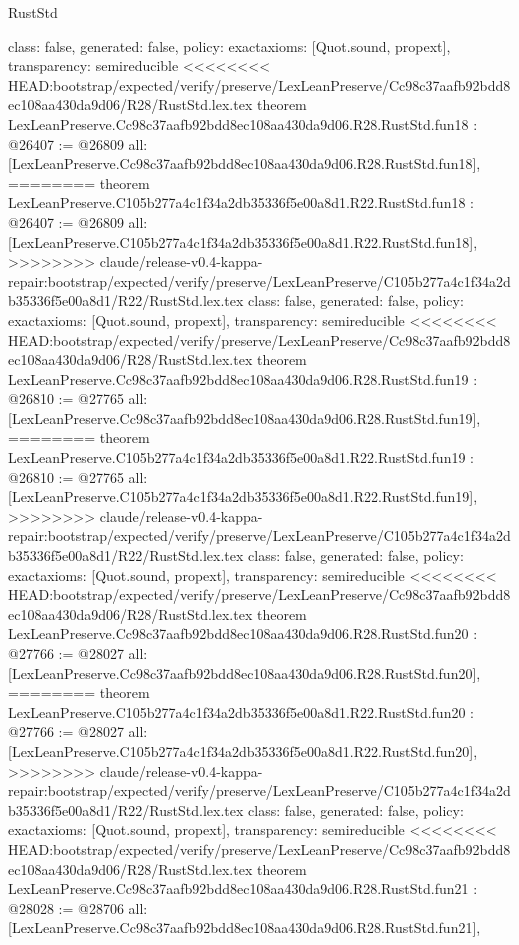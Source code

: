 \begin{lexlean}{RustStd}
\begin{coremodule}
{\begin{coremodule}
{{{{{{{{{{{{{{{{{{{{{  class: false,
  generated: false,
  policy: exact{axioms: [Quot.sound, propext]},
  transparency: semireducible
}
<<<<<<<< HEAD:bootstrap/expected/verify/preserve/LexLeanPreserve/Cc98c37aafb92bdd8ec108aa430da9d06/R28/RustStd.lex.tex
theorem LexLeanPreserve.Cc98c37aafb92bdd8ec108aa430da9d06.R28.RustStd.fun18 : @26407 := @26809 {
  all: [LexLeanPreserve.Cc98c37aafb92bdd8ec108aa430da9d06.R28.RustStd.fun18],
========
theorem LexLeanPreserve.C105b277a4c1f34a2db35336f5e00a8d1.R22.RustStd.fun18 : @26407 := @26809 {
  all: [LexLeanPreserve.C105b277a4c1f34a2db35336f5e00a8d1.R22.RustStd.fun18],
>>>>>>>> claude/release-v0.4-kappa-repair:bootstrap/expected/verify/preserve/LexLeanPreserve/C105b277a4c1f34a2db35336f5e00a8d1/R22/RustStd.lex.tex
  class: false,
  generated: false,
  policy: exact{axioms: [Quot.sound, propext]},
  transparency: semireducible
}
<<<<<<<< HEAD:bootstrap/expected/verify/preserve/LexLeanPreserve/Cc98c37aafb92bdd8ec108aa430da9d06/R28/RustStd.lex.tex
theorem LexLeanPreserve.Cc98c37aafb92bdd8ec108aa430da9d06.R28.RustStd.fun19 : @26810 := @27765 {
  all: [LexLeanPreserve.Cc98c37aafb92bdd8ec108aa430da9d06.R28.RustStd.fun19],
========
theorem LexLeanPreserve.C105b277a4c1f34a2db35336f5e00a8d1.R22.RustStd.fun19 : @26810 := @27765 {
  all: [LexLeanPreserve.C105b277a4c1f34a2db35336f5e00a8d1.R22.RustStd.fun19],
>>>>>>>> claude/release-v0.4-kappa-repair:bootstrap/expected/verify/preserve/LexLeanPreserve/C105b277a4c1f34a2db35336f5e00a8d1/R22/RustStd.lex.tex
  class: false,
  generated: false,
  policy: exact{axioms: [Quot.sound, propext]},
  transparency: semireducible
}
<<<<<<<< HEAD:bootstrap/expected/verify/preserve/LexLeanPreserve/Cc98c37aafb92bdd8ec108aa430da9d06/R28/RustStd.lex.tex
theorem LexLeanPreserve.Cc98c37aafb92bdd8ec108aa430da9d06.R28.RustStd.fun20 : @27766 := @28027 {
  all: [LexLeanPreserve.Cc98c37aafb92bdd8ec108aa430da9d06.R28.RustStd.fun20],
========
theorem LexLeanPreserve.C105b277a4c1f34a2db35336f5e00a8d1.R22.RustStd.fun20 : @27766 := @28027 {
  all: [LexLeanPreserve.C105b277a4c1f34a2db35336f5e00a8d1.R22.RustStd.fun20],
>>>>>>>> claude/release-v0.4-kappa-repair:bootstrap/expected/verify/preserve/LexLeanPreserve/C105b277a4c1f34a2db35336f5e00a8d1/R22/RustStd.lex.tex
  class: false,
  generated: false,
  policy: exact{axioms: [Quot.sound, propext]},
  transparency: semireducible
}
<<<<<<<< HEAD:bootstrap/expected/verify/preserve/LexLeanPreserve/Cc98c37aafb92bdd8ec108aa430da9d06/R28/RustStd.lex.tex
theorem LexLeanPreserve.Cc98c37aafb92bdd8ec108aa430da9d06.R28.RustStd.fun21 : @28028 := @28706 {
  all: [LexLeanPreserve.Cc98c37aafb92bdd8ec108aa430da9d06.R28.RustStd.fun21],
}}}}}}}}}}}}}}}}}}}}}}}}
\end{coremodule}}
\end{coremodule}
\end{lexlean}
